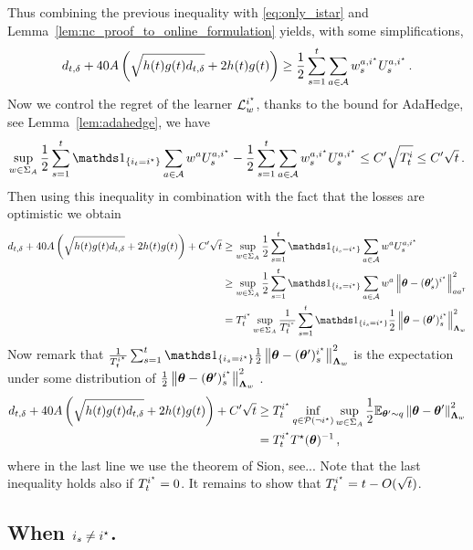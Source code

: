 Thus combining the previous inequality with \eqref{eq:only_istar} and Lemma~\ref{lem:nc_proof_to_online_formulation} yields, with some simplifications,
\begin{equation}
\label{eq:to_UCB}
d_{t,\delta} + 40 A\left(\sqrt{h(t)g(t) d_{t,\delta}}+ 2h(t)g(t)\right) \geq \frac{1}{2}\sum_{s=1}^t\sum_{a\in\mathcal{A}} w_s^{a,i^\star}U_s^{a,i^\star}\,.
\end{equation}
Now we control the regret of the learner $\mathcal{L}_w^{i^\star}$, thanks to the bound for AdaHedge, see Lemma~\ref{lem:adahedge}, we have
\[
\sup_{w\in\Sigma_A}\frac{1}{2}\sum_{s=1}^t\ind_{\{i_t = \istar\}}\sum_{a\in\cA} w^{a}U_s^{a,\istar} -\frac{1}{2}\sum_{s=1}^t\sum_{a\in\cA} w_s^{a,\istar}U_s^{a,\istar} \leq C'\sqrt{T_t^i}\leq C'\sqrt{t}\,.
\]
Then using this inequality in combination with the fact that the losses are optimistic we obtain
\begin{align*}
  d_{t,\delta} + 40 A\left(\sqrt{h(t)g(t) d_{t,\delta}}+ 2h(t)g(t)\right) +C'\sqrt{t}
  &\geq \sup_{w\in\Sigma_A}\frac{1}{2}\sum_{s=1}^t\ind_{\{i_s = \istar\}}\sum_{a\in\cA} w^{a}U_s^{a,\istar}
  \\
  &\geq \sup_{w\in\Sigma_A}\frac{1}{2}\sum_{s=1}^t\ind_{\{i_s = \istar\}}\sum_{a\in\cA} w^{a} \normm{\btheta -(\btheta'_s)^{\istar}}^2_{aa^\top}
  \\
  &= T^{\istar}_t \sup_{w\in\Sigma_A}\frac{1}{T^{i^*}_t}\sum_{s=1}^t\ind_{\{i_s = \istar\}}\frac{1}{2}\normm{\btheta -(\btheta')_s^{\istar}}^2_{\bLambda_{w}}
  \end{align*}
Now remark that $\frac{1}{T^{i^\star}_t}\sum_{s=1}^t\ind_{\{i_s = \istar\}}\frac{1}{2}\normm{\btheta -(\btheta')_s^{\istar}}^2_{\bLambda_{w}}$ is the expectation under some distribution of $\frac{1}{2}\left\lVert{\boldsymbol \theta} -({\boldsymbol \theta}')_s^{i^\star}\right\rVert^2_{{\boldsymbol \Lambda}_{w}}$ .
\begin{align*}
  d_{t,\delta} + 40 A\left(\sqrt{h(t)g(t) d_{t,\delta}}+ 2h(t)g(t)\right) +C'\sqrt{t}
  &\geq T^{i^\star}_t \inf_{q\in\mathcal{P}(\neg i^\star)} \sup_{w\in\Sigma_A}\frac{1}{2}\mathbb{E}_{{\boldsymbol \theta}'\sim q}\left\lVert{\boldsymbol \theta} -{\boldsymbol \theta}'\right\rVert^2_{{\boldsymbol \Lambda}_{w}}\\
 &=T^{i^\star}_t T^{\star}({\boldsymbol \theta})^{-1}\,,
\end{align*}
where in the last line we use the theorem of Sion, see...%
Note that the last inequality holds also if $T_t^{i^\star} = 0$. It remains to show that $T^{i^\star}_t = t- O(\sqrt{t})$.

\subsection{When $i_s \neq i^\star$.}

